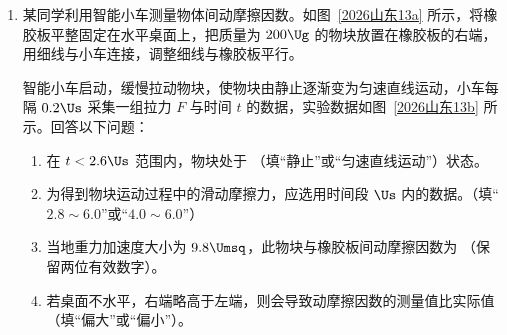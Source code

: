 \documentclass[\gkver]{gaokaozhenti}
\begin{document}
\begin{enumerate}
{联立可得 $Q_{MN} = \frac{m}{BL} \cdot \frac{Q_{2}}{C_{2}BL} = \frac{mQ_{2}}{C_{2}B^{2}L^{2}}$，$Q_{1}' = \frac{C_{1}}{C_{2}}Q_{2}$

整个过程由电荷守恒定律有 $Q_{1} = Q_{1}' + Q_{2} + Q_{MN}$

联立可得 $Q_{2} = \frac{kC_{1}C_{2}B^{2}L^{4}}{B^{2}L^{2}(C_{1} + C_{2}) + m}$，$v = \frac{Q_{2}}{C_{2}BL} = \frac{kC_{1}BL^{3}}{B^{2}L^{2}(C_{1} + C_{2}) + m}$，故 C 正确，D 错误。

故选 AC。
}

\item
某同学利用智能小车测量物体间动摩擦因数。如图~\ref{2026山东13a} 所示，将橡胶板平整固定在水平桌面上，把质量为 $200\Ug$ 的物块放置在橡胶板的右端，用细线与小车连接，调整细线与橡胶板平行。
\onepicture[num=甲, label=2026山东13a, align=right, w=8cm]{}

智能小车启动，缓慢拉动物块，使物块由静止逐渐变为匀速直线运动，小车每隔 $0.2\Us$ 采集一组拉力 $F$ 与时间 $t$ 的数据，实验数据如图~\ref{2026山东13b} 所示。回答以下问题：
\begin{enumerate}
	\item
	在 $t < 2.6\Us$ 范围内，物块处于 （填“静止”或“匀速直线运动”）状态。
	\item
	为得到物块运动过程中的滑动摩擦力，应选用时间段  $\Us$ 内的数据。（填“$2.8 \sim 6.0$”或“$4.0 \sim 6.0$”）
	\item
	当地重力加速度大小为 $9.8\Umsq$，此物块与橡胶板间动摩擦因数为 （保留两位有效数字）。
	\item
	若桌面不水平，右端略高于左端，则会导致动摩擦因数的测量值比实际值 （填“偏大”或“偏小”）。
\end{enumerate}
\end{enumerate}
\end{document}
